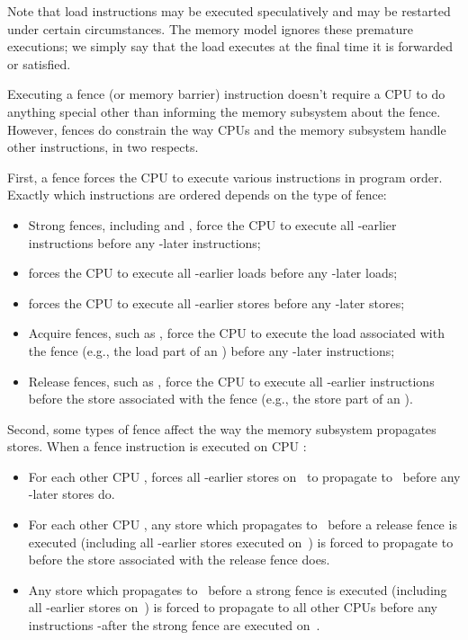 Note that load instructions may be executed speculatively and may be
restarted under certain circumstances.
The memory model ignores these premature executions; we simply say
that the load executes at the final time it is forwarded or satisfied.

Executing a fence (or memory barrier) instruction doesn't require a
CPU to do anything special other than informing the memory subsystem
about the fence.
However, fences do constrain the way CPUs and the memory subsystem
handle other instructions, in two respects.

First, a fence forces the CPU to execute various instructions in
program order.
Exactly which instructions are ordered depends on the type of fence:

\begin{itemize}
\item	Strong fences, including  and , force
	the CPU to execute all -earlier instructions before any
	-later instructions;

\item	{} forces the CPU to execute all -earlier loads
	before any -later loads;

\item	{} forces the CPU to execute all -earlier stores
	before any -later stores;

\item	Acquire fences, such as , force the CPU to
	execute the load associated with the fence (e.g., the load
	part of an ) before any -later
	instructions;

\item	Release fences, such as , force the CPU to
	execute all -earlier instructions before the store
	associated with the fence (e.g., the store part of an
	).
\end{itemize}

Second, some types of fence affect the way the memory subsystem
propagates stores.
When a fence instruction is executed on CPU :

\begin{itemize}
\item	For each other CPU ,  forces all -earlier stores
	on~ to propagate to~ before any -later stores do.

\item	For each other CPU , any store which propagates to~ before
	a release fence is executed (including all -earlier
	stores executed on~) is forced to propagate to~ before the
	store associated with the release fence does.

\item	Any store which propagates to~ before a strong fence is
	executed (including all -earlier stores on~) is forced to
	propagate to all other CPUs before any instructions -after
	the strong fence are executed on~.
\end{itemize}

